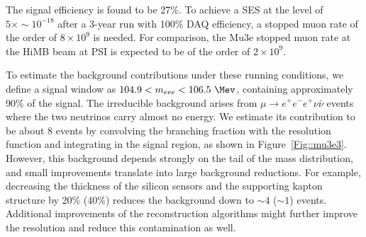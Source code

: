 The signal efficiency is found to be 27\%. To achieve a SES at the level of $5\times\sim 10^{-18}$ after a 3-year run with 100\% DAQ efficiency, a stopped muon rate of the order of $8\times 10^{9}$ is needed. For comparison, the Mu3e stopped muon rate at the HiMB beam at PSI is expected to be of the order of $2\times 10^{9}$.   

To estimate the background contributions under these running conditions, we define a signal window as $ 104.9 < m_{eee} < 106.5 ~\Mev$, containing approximately 90\% of the signal. The irreducible background arises from $\mu \rightarrow e^+e^-e^+ \nu\bar\nu$ events where the two neutrinos carry almost no energy. We estimate its contribution to be about 8 events by convolving the branching fraction with the resolution function and integrating in the signal region, as shown in Figure~\ref{Fig::mu3e3}. However, this background depends strongly on the tail of the mass distribution, and small improvements translate into large background reductions. For example, decreasing the thickness of the silicon sensors and the supporting kapton structure by 20\% (40\%) reduces the background down to $\sim 4$ ($\sim 1$) events. Additional improvements of the reconstruction algorithms might further improve the resolution and reduce this contamination as well.

